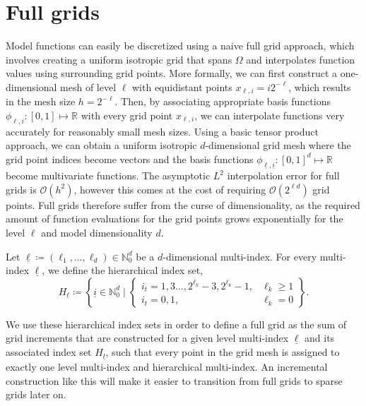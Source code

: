 \documentclass[
  a4paper,  %
  twoside,  %
  bibliography=totoc,
  headsepline,
  cleardoublepage=empty,
  parskip=half,
  draft=false
]{scrbook}
\begin{document}
\section{Full grids}

Model functions can easily be discretized using a naive full grid approach, which involves creating a uniform isotropic grid that spans $\Omega$ and interpolates function values using surrounding grid points.
More formally, we can first construct a one-dimensional mesh of level $\ell$ with equidistant points $x_{\ell,i}=i2^{-\ell}$, which results in the mesh size $h=2^{-\ell}$.
Then, by associating appropriate basis functions $\phi_{\ell,i} \colon [0,1] \mapsto \mathds{R}$ with every grid point $x_{\ell,i}$, we can interpolate functions very accurately for reasonably small mesh sizes.
Using a basic tensor product approach, we can obtain a uniform isotropic $d$-dimensional grid mesh where the grid point indices become vectors and the basis functions $\phi_{\underline{\ell},\underline{i}} \colon [0,1]^d \mapsto \mathds{R}$ become multivariate functions.
The asymptotic $L^2$ interpolation error for full grids is $\mathcal{O}(h^2)$, however this comes at the cost of requiring $\mathcal{O}(2^{\ell d})$ grid points.
Full grids therefore suffer from the curse of dimensionality, as the required amount of function evaluations for the grid points grows exponentially for the level $\ell$ and model dimensionality $d$.

\begin{definition}
Let $\underline{\ell} \coloneqq (\ell_1, \dots, \ell_d) \in \mathds{N}_0^d$ be a $d$-dimensional multi-index.
For every multi-index $\underline{\ell}$, we define the hierarchical index set,
\begin{equation}
H_{\underline{\ell}} \coloneqq \left\{ \underline{i} \in \mathds{N}^d_0 \mid
\begin{cases}
    i_t=1,3\dots,2^{\ell_k} - 3, 2^{\ell_k} - 1, & \ell_k \geq 1 \\
    i_t=0,1, & \ell_k = 0
\end{cases} \right\}.
\end{equation}
\end{definition}
%
We use these hierarchical index sets in order to define a full grid as the sum of grid increments that are constructed for a given level multi-index $\underline{\ell}$ and its associated index set $H_{\underline{l}}$, such that every point in the grid mesh is assigned to exactly one level multi-index and hierarchical multi-index.
An incremental construction like this will make it easier to transition from full grids to sparse grids later on.
\end{document}
